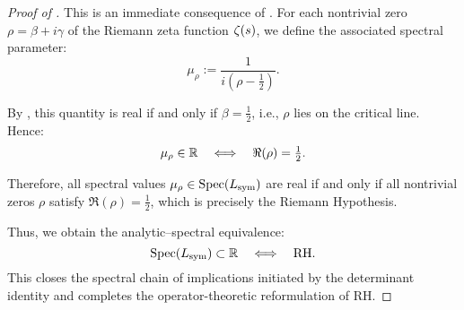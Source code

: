 \begin{proof}[Proof of ]
This is an immediate consequence of . For each nontrivial zero \( \rho = \beta + i\gamma \) of the Riemann zeta function \( \zeta(s) \), we define the associated spectral parameter:
\[
\mu_\rho := \frac{1}{i(\rho - \tfrac{1}{2})}.
\]

By , this quantity is real if and only if \( \beta = \tfrac{1}{2} \), i.e., \( \rho \) lies on the critical line. Hence:
\[
\mu_\rho \in \mathbb{R} \quad \Longleftrightarrow \quad \Re(\rho) = \tfrac{1}{2}.
\]

Therefore, all spectral values \( \mu_\rho \in \operatorname{Spec}(L_{\mathrm{sym}}) \) are real if and only if all nontrivial zeros \( \rho \) satisfy \( \Re(\rho) = \tfrac{1}{2} \), which is precisely the Riemann Hypothesis.

\medskip

\noindent
Thus, we obtain the analytic–spectral equivalence:
\[
\operatorname{Spec}(L_{\mathrm{sym}}) \subset \mathbb{R} \quad \Longleftrightarrow \quad \mathrm{RH}.
\]
This closes the spectral chain of implications initiated by the determinant identity and completes the operator-theoretic reformulation of RH.
\end{proof}
